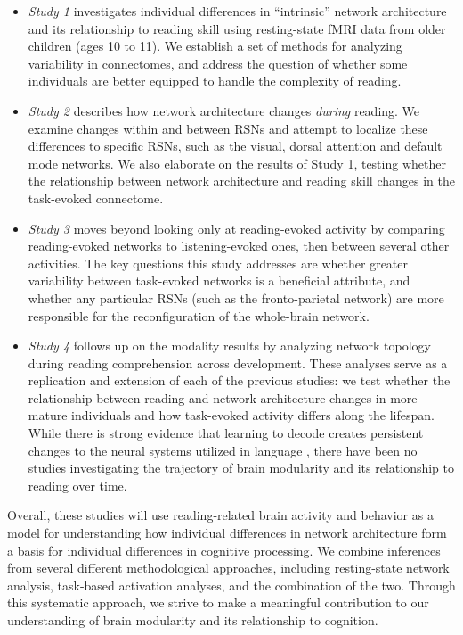 \begin{itemize}

    \item \textit{Study 1} investigates individual differences in ``intrinsic'' network architecture and its relationship to reading skill using resting-state fMRI data from older children (ages 10 to 11). We establish a set of methods for analyzing variability in connectomes, and address the question of whether some individuals are better equipped to handle the complexity of reading. 

    \item \textit{Study 2} describes how network architecture changes \textit{during} reading. We examine changes within and between RSNs and attempt to localize these differences to specific RSNs, such as the visual, dorsal attention and default mode networks. We also elaborate on the results of Study 1, testing whether the relationship between network architecture and reading skill changes in the task-evoked connectome. 

    \item \textit{Study 3} moves beyond looking only at reading-evoked activity by  comparing reading-evoked networks to listening-evoked ones, then between several other activities. The key questions this study addresses are whether greater variability between task-evoked networks is a beneficial attribute, and whether any particular RSNs (such as the fronto-parietal network) are more responsible for the reconfiguration of the whole-brain network.

    \item \textit{Study 4} follows up on the modality results by analyzing network topology during reading comprehension across development. These analyses serve as a replication and extension of each of the previous studies: we test whether the relationship between reading and network architecture changes in more mature individuals and how task-evoked activity differs along the lifespan. While there is strong evidence that learning to decode creates persistent changes to the neural systems utilized in language \citep{Schlaggar2007}, there have been no studies investigating the trajectory of brain modularity and its relationship to reading over time.

\end{itemize}

Overall, these studies will use reading-related brain activity and behavior as a model for understanding how individual differences in network architecture form a basis for individual differences in cognitive processing. We combine inferences from several different methodological approaches, including resting-state network analysis, task-based activation analyses, and the combination of the two. Through this systematic approach, we strive to make a meaningful contribution to our understanding of brain modularity and its relationship to cognition.